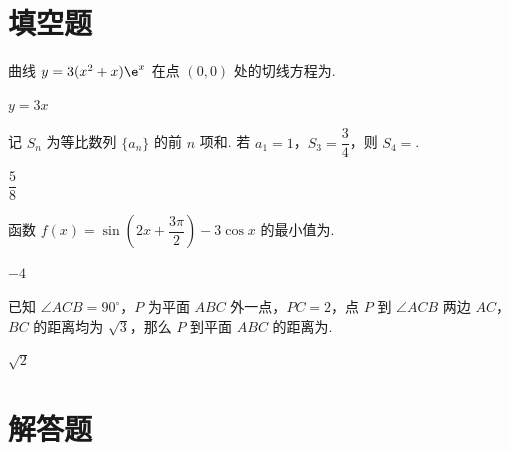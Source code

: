 \section{填空题}

\begin{problem}
曲线 \( y=3(x^2+x)\e^x \) 在点 \( (0,0) \) 处的切线方程为\fillinblank{}.
\end{problem}

\begin{answer}
\(y=3x\)
\end{answer}

\begin{problem}
记 \( S_n \) 为等比数列 \( \{a_n\} \) 的前 \( n \) 项和. 若 \( a_1=1 \)，\( S_3=\dfrac{3}{4} \)，则 \( S_4=\)\fillinblank{}.
\end{problem}

\begin{answer}
\(\dfrac{5}{8}\)
\end{answer}

\begin{problem}
函数 \( f(x)=\sin \left( 2x+\dfrac{3\pi}{2} \right)-3\cos x \) 的最小值为\fillinblank{}.
\end{problem}

\begin{answer}
\(-4\)
\end{answer}

\begin{problem}
已知 \( \angle ACB=90^\circ \)，\(P\) 为平面 \(ABC\) 外一点，\( PC=2 \)，点 \(P\) 到 \( \angle ACB \) 两边 \(AC\)，\(BC\) 的距离均为 \( \sqrt3 \)，那么 \(P\) 到平面 \(ABC\) 的距离为\fillinblank{}.
\end{problem}

\begin{answer}
\(\sqrt2\)
\end{answer}

\section{解答题}

